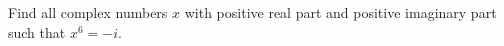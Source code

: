 Find all complex numbers $x$ with positive real part and positive imaginary part such that $x^6=-i$.
